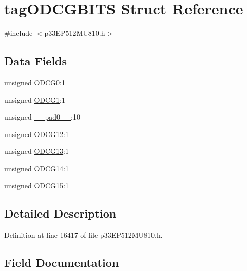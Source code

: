 \hypertarget{structtag_o_d_c_g_b_i_t_s}{}\section{tag\+O\+D\+C\+G\+B\+I\+TS Struct Reference}
\label{structtag_o_d_c_g_b_i_t_s}


{\ttfamily \#include $<$p33\+E\+P512\+M\+U810.\+h$>$}

\subsection*{Data Fields}
\begin{DoxyCompactItemize}
\item 
unsigned \hyperlink{structtag_o_d_c_g_b_i_t_s_ae388150c3b59fd94e1d3ca73df88892b}{O\+D\+C\+G0}\+:1
\item 
unsigned \hyperlink{structtag_o_d_c_g_b_i_t_s_a3bab52f97f53e0009d00c4c1e4f940b7}{O\+D\+C\+G1}\+:1
\item 
unsigned \hyperlink{structtag_o_d_c_g_b_i_t_s_adf71f3d8410c1f1dbbc96680a92c49af}{\+\_\+\+\_\+pad0\+\_\+\+\_\+}\+:10
\item 
unsigned \hyperlink{structtag_o_d_c_g_b_i_t_s_ad80173f4c02ef498ede957c228b580cb}{O\+D\+C\+G12}\+:1
\item 
unsigned \hyperlink{structtag_o_d_c_g_b_i_t_s_a0b99aa6428aaf64cd07563994d226a4a}{O\+D\+C\+G13}\+:1
\item 
unsigned \hyperlink{structtag_o_d_c_g_b_i_t_s_ae10c223139b87c2d5ef8edc93bf8bcd4}{O\+D\+C\+G14}\+:1
\item 
unsigned \hyperlink{structtag_o_d_c_g_b_i_t_s_a507b910337e81beaa9773d2cdaa08ec8}{O\+D\+C\+G15}\+:1
\end{DoxyCompactItemize}


\subsection{Detailed Description}


Definition at line 16417 of file p33\+E\+P512\+M\+U810.\+h.



\subsection{Field Documentation}
\mbox{\label{structtag_o_d_c_g_b_i_t_s_adf71f3d8410c1f1dbbc96680a92c49af}} 
